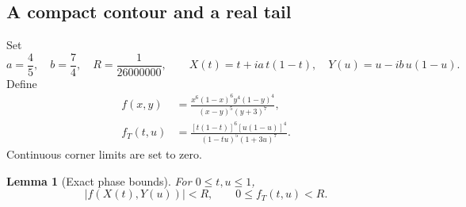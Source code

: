 \documentclass[11pt]{amsart}
\theoremstyle{plain}
\newtheorem{lemma}[theorem]{Lemma}
\theoremstyle{remark}\newtheorem{remark}[theorem]{Remark}
\numberwithin{equation}{section}
\begin{document}
\subsection{A compact contour and a real tail}\label{t:sec:contours}
Set
\[
 a=\frac45,\quad b=\frac74,\quad R=\frac1{26000000},\qquad
 X(t)=t+ia\,t(1-t),\quad Y(u)=u-ib\,u(1-u).
\]
Define
\begin{align}
 f(x,y)&=\frac{x^6(1-x)^6y^4(1-y)^4}{(x-y)^5(y+3)^7},
       \label{t:eq:phase-complex}\\
 f_T(t,u)&=\frac{[t(1-t)]^6[u(1-u)]^4}
 {(1-tu)^5(1+3u)^7}.
       \label{t:eq:phase-tail}
\end{align}
Continuous corner limits are set to zero.

\begin{lemma}[Exact phase bounds]\label{t:lem:phases}
For $0\le t,u\le1$,
\[
 |f(X(t),Y(u))|<R,\qquad 0\le f_T(t,u)<R.
\]
\end{lemma}
\end{document}
